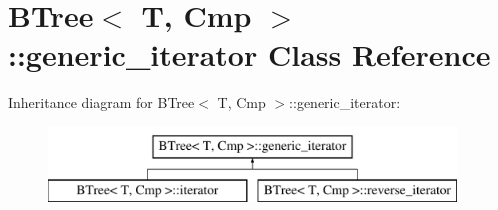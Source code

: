 \hypertarget{classBTree_1_1generic__iterator}{
\section{BTree$<$ T, Cmp $>$::generic\_\-iterator Class Reference}
\label{classBTree_1_1generic__iterator}
}
Inheritance diagram for BTree$<$ T, Cmp $>$::generic\_\-iterator:\begin{figure}[H]
\begin{center}
\leavevmode
\includegraphics[height=2.000000cm]{classBTree_1_1generic__iterator}
\end{center}
\end{figure}
